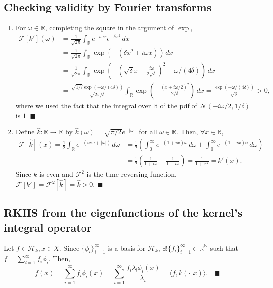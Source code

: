 \documentclass[11pt]{article}
\renewcommand{\qed}{\quad \ensuremath{\blacksquare}}
\newcommand{\F}{\mathcal{F}}
\newcommand{\N}{\mathbb{N}} %
\newcommand{\R}{\mathbb{R}} %
\begin{document}
\subsection{Checking validity by Fourier transforms}
\begin{enumerate}
\item For $\omega \in \R$, completing the square in the argument of $\exp$,
\begin{align*}
\F[k'](\omega)
 &  = \frac{1}{\sqrt{2\pi}} \int_\R e^{-i\omega x} e^{-\delta x^2} \, dx    \\
 &  = \frac{1}{\sqrt{2\pi}} \int_\R
                        \exp \left( -(\delta x^2 + i\omega x) \right) \, dx \\
 &  = \frac{1}{\sqrt{2\pi}} \int_\R \exp \left(
        -\left( \sqrt{\delta} x + \frac{i\omega}{2\sqrt{\delta}} \right)^2
    - \omega/(4\delta)
        \right) \, dx \\
 &  = \frac{\sqrt{1/\delta}\exp(-\omega/(4\delta))}{\sqrt{2\pi/\delta}}
            \int_\R \exp \left(
                -\frac{\left( x + i\omega/2 \right)^2}{2/\delta}
            \right) \, dx
    = \frac{\exp(-\omega/(4\delta))}{\sqrt{\delta}}
    > 0,
\end{align*}
where we used the fact that the integral over $\R$ of the pdf of
$\mathcal{N}(-i\omega/2,1/\delta)$ is $1$. \qed

\item Define $\hat k : \R \to \R$ by
$\hat k(\omega) = \sqrt{\pi/2} e^{-|\omega|}$, for all $\omega \in \R$. Then,
$\forall x \in \R$,
\begin{align*}
\F\left[ \hat k \right](x)
    = \frac{1}{2} \int_\R e^{-(ix\omega + |\omega|)} \, d\omega
 &  = \frac{1}{2} \left( \int_0^\infty e^{-(1 + ix)\omega} \, d\omega
    + \int_0^\infty e^{-(1 - ix)\omega} \, d\omega \right)  \\
 &  = \frac{1}{2} \left( \frac{1}{1 + ix} + \frac{1}{1 - ix} \right)
    = \frac{1}{1 + x^2}
    = k'(x).
\end{align*}
Since $\hat k$ is even and $\F^2$ is the time-reversing function,
$\F[k'] = \F^2 \left[ \hat k \right] = \hat k > 0$. \qed
\end{enumerate}

\subsection{RKHS from the eigenfunctions of the kernel's integral operator}
Let $f \in \mathcal{H}_k, x \in X$. Since $\{\phi_i\}_{i = 1}^\infty$ is a
basis for $\mathcal{H}_k$, $\exists !\{f_i\}_{i = 1}^\infty \in \R^\N$ such that
$f = \sum_{i = 1}^\infty f_i \phi_i$. Then,
\[f(x)
    = \sum_{i = 1}^\infty f_i \phi_i(x)
    = \sum_{i = 1}^\infty \frac{f_i \lambda_i \phi_i(x)}{\lambda_i}
    = \langle f, k(\cdot,x) \rangle. \qed
\]
\end{document}
